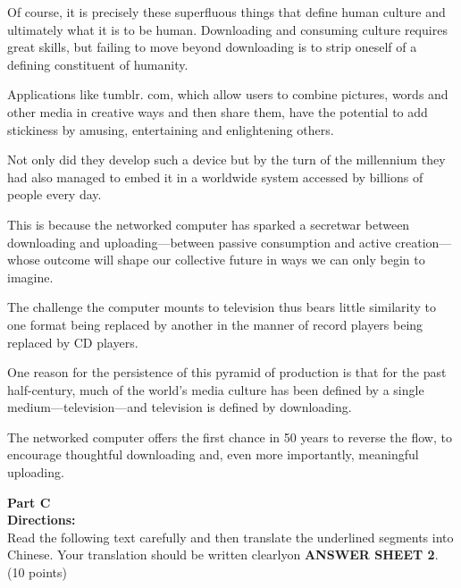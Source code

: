\begin{listmatch}
	\item
 Of course, it is precisely these superfluous things that define
human culture and ultimately what it is to be human. Downloading and
consuming culture requires great skills, but failing to move beyond
downloading is to strip oneself of a defining constituent of humanity.


\item 
Applications like tumblr. com, which allow users to combine
pictures, words and other media in creative ways and then share them,
have the potential to add stickiness by amusing, entertaining and
enlightening others.


\item 
Not only did they develop such a device but by the turn of the
millennium they had also managed to embed it in a worldwide system
accessed by billions of people every day.


\item 
This is because the networked computer has sparked a secretwar
between downloading and uploading---between passive consumption and
active creation---whose outcome will shape our collective future in
ways we can only begin to imagine.


\item 
The challenge the computer mounts to television thus bears
little similarity to one format being replaced by another in the manner
of record players being replaced by CD players.


\item 
One reason for the persistence of this pyramid of production is
that for the past half-century, much of the world's media culture has
been defined by a single medium---television---and television is
defined by downloading.


\item 
The networked computer offers the first chance in 50 years to
reverse the flow, to encourage thoughtful downloading and, even more
importantly, meaningful uploading.
\end{listmatch}


\newpage
\noindent
\textbf{Part C}\\
\textbf{Directions:}\\
Read the following text carefully and then translate the
	underlined segments into Chinese. Your translation should be written
	clearlyon \textbf{ANSWER SHEET 2}. (10 points)



